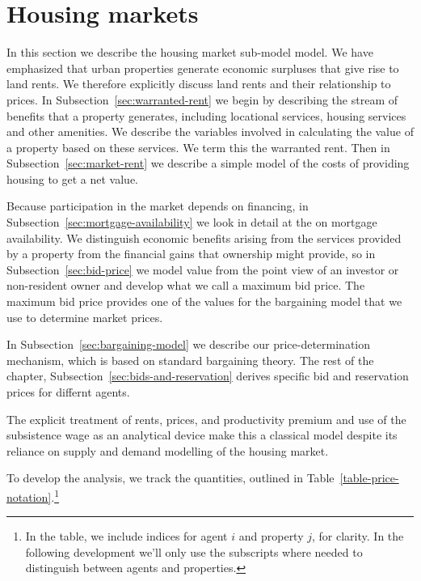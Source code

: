 



\section{Housing markets} \label{section-rent}
In this section we describe the housing market sub-model model. %
We have emphasized that urban properties generate economic surpluses that give rise to land rents. We therefore explicitly discuss land rents and their relationship to prices. In Subsection~\ref{sec:warranted-rent} we begin by describing the stream of benefits that a property generates, including locational services, housing services and other amenities.  We describe the variables involved in calculating the value of a property based on these services. We term this the \gls{warranted rent}. Then in Subsection~\ref{sec:market-rent} we describe a simple model of the costs of providing housing to get a net value. 

Because participation in the market depends on financing, in Subsection~\ref{sec:mortgage-availability} we look in detail at the on mortgage availability. We distinguish economic benefits arising from the services provided by a property from the financial gains that ownership might provide, so in Subsection~\ref{sec:bid-price} we model value  from the point view of an investor or non-resident owner and develop what we call a maximum bid price.  The maximum bid price provides one of the values for the bargaining model that we use to determine market prices. 

In Subsection~\ref{sec:bargaining-model} we describe our price-determination mechanism, which is based on standard bargaining theory.  The rest of the chapter, Subsection~\ref{sec:bids-and-reservation} derives specific bid and reservation prices for differnt agents.

 The explicit treatment of rents, prices, and  productivity \gls{premium} and use of the \gls{subsistence wage} as an analytical device  make this a \gls{classical} model despite its reliance on supply and demand modelling of the housing market. 

 To develop the analysis, we track the quantities, outlined in Table~\ref{table-price-notation}.\footnote{In the table, we include indices for agent $i$ and property $j$, for clarity. In the following development we'll only use the subscripts where needed to distinguish between agents and properties.}

